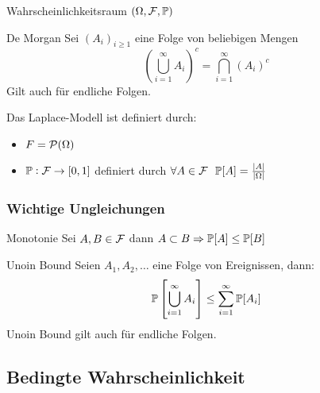 \begin{definition}{Wahrscheinlichkeitsraum} 
	$(\Omega, \mathcal{F}, \mathbb{P})$
\end{definition}
\begin{tprop}{De Morgan}
	Sei $(A_i)_{i \geq 1}$ eine Folge von beliebigen Mengen
	\begin{equation*}
		\left( \bigcup_{i=1}^\infty A_i \right)^c = \bigcap_{i=1}^\infty (A_i)^c
	\end{equation*}
	Gilt auch für endliche Folgen.
\end{tprop}
Das Laplace-Modell ist definiert durch:
\begin{itemize}
	\item $F = \mathcal{P} (\Omega)$
	\item $\mathbb{P}: \mathcal{F} \rightarrow [0,1]$ definiert durch $\forall A \in \F ~ \pr [A] = \frac{|A|}{|\Omega|}$
\end{itemize}

\subsubsection{Wichtige Ungleichungen}%
\label{ssub:wichtige_ungleichungen}

\begin{tprop}{Monotonie}
	Sei $A,B \in \mathcal{F}$ dann $A \subset B \Rightarrow \mathbb{P} [A] \leq \mathbb{P} [B]$
\end{tprop}
\begin{tprop}{Unoin Bound}
	Seien $A_1 , A_2 , \ldots$ eine Folge von Ereignissen, dann:
	\begin{equation*}
		\mathbb{P} \left[ \bigcup_{i=1}^\infty A_i \right] \leq \sum^{\infty}_{i=1} \mathbb{P} [A_i]
	\end{equation*}
	Unoin Bound gilt auch für endliche Folgen.
\end{tprop}


\subsection{Bedingte Wahrscheinlichkeit}%
\label{sub:bedingte_wahrscheinlichkeit}

